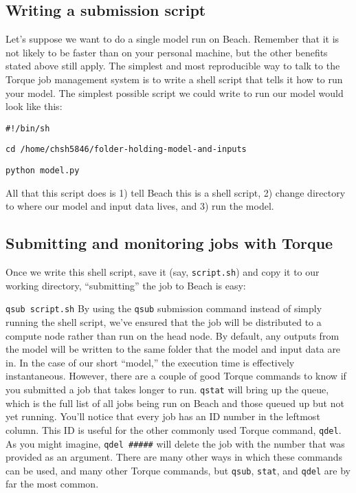 \documentclass[12pt, oneside]{article}   	%
\begin{document}
\subsection{Writing a submission script}
Let's suppose we want to do a single model run on Beach. Remember that it is not likely to be faster than on your personal machine, but the other benefits stated above still apply. The simplest and most reproducible way to talk to the Torque job management system is to write a shell script that tells it how to run your model. The simplest possible script we could write to run our model would look like this:\par
\vspace{.2in}
\texttt{\#!/bin/sh}\par
\texttt{cd /home/chsh5846/folder-holding-model-and-inputs}\par
\texttt{python model.py}\par
\vspace{.2in}
All that this script does is 1) tell Beach this is a shell script, 2) change directory to where our model and input data lives, and 3) run the model. 
\subsection{Submitting and monitoring jobs with Torque}
Once we write this shell script, save it (say, \texttt{script.sh}) and copy it to our working directory, ``submitting'' the job to Beach is easy:\par
\vspace{.2in}
\texttt{qsub script.sh}
\vspace{.2in}
By using the \texttt{qsub} submission command instead of simply running the shell script, we've ensured that the job will be distributed to a compute node rather than run on the head node. By default, any outputs from the model will be written to the same folder that the model and input data are in. In the case of our short ``model,'' the execution time is effectively instantaneous. However, there are a couple of good Torque commands to know if you submitted a job that takes longer to run. \texttt{qstat} will bring up the queue, which is the full list of all jobs being run on Beach and those queued up but not yet running. You'll notice that every job has an ID number in the leftmost column. This ID is useful for the other commonly used Torque command, \texttt{qdel}. As you might imagine, \texttt{qdel \#\#\#\#\#} will delete the job with the number that was provided as an argument. There are many other ways in which these commands can be used, and many other Torque commands, but \texttt{qsub}, \texttt{stat}, and \texttt{qdel} are by far the most common.
\end{document}
